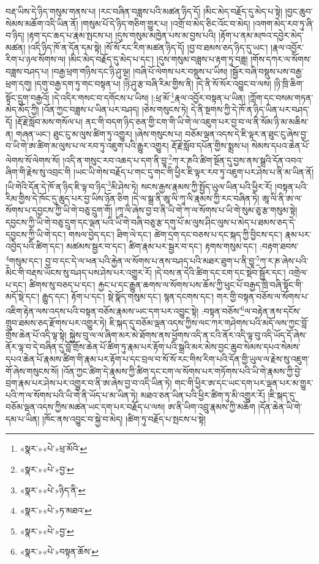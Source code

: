 བརྡ་ཡིས་དེ་ཉིད་གསུམ་གནས་པ། །རང་བཞིན་བཟླས་པའི་མཚན་ཉིད་དོ། །མིང་མེད་བརྗོད་དུ་མེད་པ་སྟེ། །བྱང་ཆུབ་སེམས་མཆོག་འདི་ཡིན་ནོ། །གསུམ་པོ་དེ་ཉིད་གཅིག་གྱུར་པ། །འགྲོ་བ་མེད་ཅིང་འོང་བ་མེད། །འགག་མེད་རབ་ཏུ་ཞི་བ་ཉིད། །རྟག་དང་ཆད་པ་རྣམ་སྤངས་པ། །དུས་གསུམ་མཁྱེན་པས་མ་བྱས་པའི། །རྟོག་པ་ནམ་མཁའ་དབྱེར་མེད་མཚན། །འདི་ཉིད་ཁོ་ན་དོན་དམ་སྟེ། །སོ་སོ་རང་རིག་མཚན་ཉིད་དོ། །བྱ་བ་ཐམས་ཅད་ཉིད་དུ་ཡང་། །རྣལ་འབྱོར་རིག་པ་ཉལ་སོགས་ལ། །མིང་མེད་བརྗོད་དུ་མེད་པ་དང་། །དུས་གསུམ་བཟླས་པ་རྟག་ཏུ་བཟླ། །གོས་དཀར་ལ་སོགས་བཟླས་བཤད་པ། །བརྒྱ་ཕྲག་གཉིས་དང་ཉི་ཤུ་ལྔ། །བཞི་པོ་ལེགས་པར་བསྡུས་པ་ཡིས། །སྦྱོར་བཞི་བསྡུས་པས་བརྒྱ་ཕྲག་དགུ། །དགུ་བརྒྱ་དག་ཏུ་གང་བསྟན་པ། །ཉི་ཤུ་རྩ་བཞི་རིམ་གྱིས་ནི། །དེ་ནི་སོ་སོར་འབྱུང་བ་ལས། །ཉི་ཁྲི་ཆིག་སྟོང་དྲུག་བརྒྱའོ། །དེ་འདིར་གསང་བ་དགོངས་པ་ཡིས། །:ཕྲ་མོ་\footnote{«སྣར་»«པེ་»ཕྲ་མོའི་}རྣལ་འབྱོར་བསྟན་པ་ཡིན། །ཀློག་དང་བསམ་གཏན་མེད་མོད་ཀྱི། །འོན་ཀྱང་བཟླས་པ་ཡིན་པར་བཤད། །ཅེས་གསུངས་ཏེ། དེ་ནི་སྔགས་ཀྱི་དེ་ཁོ་ན་ཉིད་ཡིན་པར་བཤད་དོ། །རྡོ་རྗེ་སློབ་མས་གསོལ་པ། ནང་གི་བདག་ཉིད་ཅན་གྱི་ངག་གི་ཡི་གེ་ལ་འཇུག་པར་བྱ་བ་ལ་ནི་སོམ་ཉི་མ་མཆིས་ན། གཞན་ཡང་། ཐུང་ངུ་མ་ལུས་ཚིག་ཏུ་འགྱུར། །ཞེས་གསུངས་པ། བཅོམ་ལྡན་འདས་དེ་ཇི་ལྟར་ན་ཐུང་ངུ་ཞེས་བྱ་བ་ཡི་གེ་ཨ་ཚིག་མ་ལུས་པ་ལ་རབ་ཏུ་འཇུག་པའི་རྒྱུར་འགྱུར། རྡོ་རྗེ་སློབ་དཔོན་གྱིས་སྨྲས་པ། སེམས་དཔའ་ཆེན་པོ་ལེགས་སོ་ལེགས་སོ། །འདི་ན་གསུང་རབ་འཆད་པ་དག་ནི་བྱཱ་\footnote{«སྣར་»«པེ་»བྱ་}ཀ་ར་ཎའི་ཚིག་སྔོན་དུ་བྱས་ནས་སྒྲའི་དོན་འབའ་ཞིག་གི་རྗེས་སུ་འབྲང་གི །ཡང་ཡི་གེས་བརྗོད་པ་གང་དུ་གང་གི་ཕྱིར་ཇི་ལྟར་རབ་ཏུ་འཇུག་པར་ཤེས་པ་ནི་མ་ཡིན་ནོ། །ཡི་གེའི་དོན་དེ་ཁོ་ན་ཉིད་ཇི་ལྟ་བ་ཉིད་\footnote{«སྣར་»«པེ་»ཉིད་ནི་}མི་ཤེས་ཏེ། སངས་རྒྱས་རྣམས་ཀྱི་སྤྱོད་ཡུལ་ཡིན་པའི་ཕྱིར་རོ། །བསྟན་པའི་རིམ་གྱིས་དེ་ཁོང་དུ་ཆུད་པར་བྱ་ཡིས་ཉོན་ཅིག །དེ་ལ་སྒྲ་ནི་ཨཱ་ལི་ཀཱ་ལི་རྣམས་ཀྱི་རང་བཞིན་ཏེ། ཨཱ་ལི་ནི་ཨ་ལ་སོགས་པ་དབྱངས་ཀྱི་ཡི་གེ་བཅུ་དྲུག་གོ། །ཀཱ་ལི་ཞེས་བྱ་བ་ནི་ཡི་གེ་ཀ་ལ་སོགས་པ་ཡི་གེ་སུམ་ཅུ་རྩ་གསུམ་སྟེ། དབྱངས་ཀྱི་ཡི་གེ་བཅུ་དྲུག་དང་ལྡན་པའི་ཡི་གེ་བཞི་བཅུ་རྩ་དགུ་པོ་མ་ལུས་ཤིང་ལུས་པ་མེད་པ་ཐམས་ཅད་དེ་དབྱངས་ཀྱི་ཡི་གེ་དང་། གསལ་བྱེད་དང་། ཐིག་ལེ་དང་། ཚེག་དྲག་དང་བཅས་པ་དང་སྐད་ཀྱི་བྱིངས་དང་། རྣམ་པར་འབྱེད་པའི་ཚིག་དང་། མཚམས་སྦྱར་བ་དང་། ཚིག་རྣམ་པར་སྦྱར་བ་དང་། རྟགས་གསུམ་དང་། :བརྟག་ཐབས་\footnote{«སྣར་»«པེ་»ཏ་མཐའ་}གསུམ་དང་། བྱ་བ་དང་དེ་ལ་ཕན་པའི་རྐྱེན་ལ་སོགས་པ་ནས་བཤད་པའི་མཐར་ཐུག་པ་ནི་བྱཱ་\footnote{«སྣར་»«པེ་»བྱ་}ཀ་ར་ཎ་ཞེས་པའི་མིང་གི་བརྡས་ཡོངས་སུ་བཤད་པས་ཤེས་པར་འགྱུར་རོ། །དེ་བས་ན་དེའི་ཚིག་དང་ངག་དང་སྡེབ་སྦྱོར་དང་། འགྲེལ་པ་དང་། ཚིགས་སུ་བཅད་པ་དང་། རྐྱང་པ་དང་རྒྱུན་ཆགས་ལ་སོགས་པས་ཆོས་ཀྱི་ཕུང་པོ་བརྒྱད་ཁྲི་བཞི་སྟོང་གི་མདོ་སྡེ་དང་། རྒྱུད་དང་། རྟོག་པ་དང་། སྡེ་སྣོད་གསུམ་དང་། སྙན་དངགས་དང་། གར་གྱི་བསྟན་བཅོས་ལ་སོགས་པ་འཇིག་རྟེན་ལས་འདས་པའི་བསྟན་བཅོས་རྣམས་ཡང་དག་པར་འབྱུང་སྟེ། :བསྟན་བཅོས་\footnote{«སྣར་»«པེ་»བསྟན་ཆོས་}ལ་བརྟེན་ནས་དངོས་གྲུབ་ཐམས་ཅད་རྫོགས་པར་འགྱུར་ཏེ། ཇི་སྐད་དུ་བཅོམ་ལྡན་འདས་ཀྱིས་ལང་ཀར་གཤེགས་པའི་མདོ་ལས་ཀྱང་བློ་གྲོས་ཆེན་པོ་འདི་ལྟ་སྟེ། སྐྱེས་བུ་ལ་ལ་ཞིག་མར་མེ་ཐོགས་ནས་ཕྱོགས་འདི་ན་ངའི་ནོར་འདི་ལྟ་བུ་འདི་ཡོད་དོ་ཞེས་ནོར་ལྟ་བ་དེ་བཞིན་དུ་བློ་གྲོས་ཆེན་པོ་ཚིག་ཏུ་རྣམ་པར་རྟོག་པའི་སྒྲའི་མར་མེས་བྱང་ཆུབ་སེམས་དཔའ་སེམས་དཔའ་ཆེན་པོ་རྣམས་ཚིག་གི་རྣམ་པར་རྟོག་པ་དང་བྲལ་བ་སོ་སོ་རང་གིས་རིག་པའི་དོན་གྱི་ཡུལ་ལ་རྗེས་སུ་འཇུག་གོ་ཞེས་གསུངས་སོ། །འོན་ཀྱང་ཚིག་དེ་རྣམས་ཀྱི་ཚིག་དང་ངག་ལ་སོགས་པར་གཏོགས་པའི་ཡི་གེ་རྣམས་ཀྱི་བྱེ་བྲག་རྣམ་པར་ཤེས་པར་འགྱུར་བ་ནི་ཨ་ཞེས་བྱ་བ་འདི་ཡིན་ཏེ། གང་གི་ཕྱིར་ཨ་དང་ཡང་དག་པར་ལྡན་པར་མ་གྱུར་པའི་ཀ་ལ་སོགས་པའི་ཡི་གེ་ནི་ཡོད་པ་མ་ཡིན་ཏེ། མཐའ་ཅན་ཡིན་པའི་ཕྱིར་ཚིག་ཏུ་མི་འགྱུར་རོ། །ཇི་སྐད་དུ་བཅོམ་ལྡན་འདས་ཀྱིས་མཚན་ཡང་དག་པར་བརྗོད་པ་ལས། ཨ་ནི་ཡིག་འབྲུ་རྣམས་ཀྱི་མཆོག །དོན་ཆེན་ཡི་གེ་དམ་པ་ཡིན། །ཁོང་ནས་འབྱུང་བ་སྐྱེ་བ་མེད། །ཚིག་ཏུ་བརྗོད་པ་སྤངས་པ་སྟེ། 